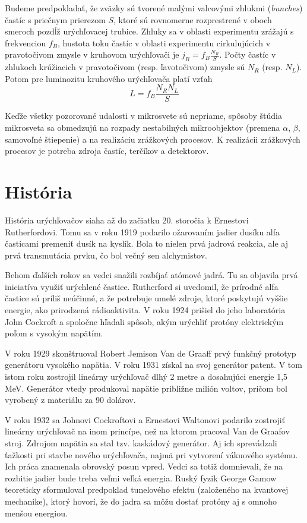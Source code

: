 \documentclass[../../main.tex]{subfiles}
\begin{document}
Budeme predpokladať, že zväzky sú tvorené malými valcovými zhlukmi (\textit{bunches}) častíc s priečnym prierezom $S$, ktoré sú rovnomerne rozprestrené v oboch smeroch pozdĺž urýchľovacej trubice. Zhluky sa v oblasti experimentu zrážajú s frekvenciou $f_B$, hustota toku častíc v oblasti experimentu cirkulujúcich v pravotočivom zmysle v kruhovom urýchľovači je $j_R=f_B\frac{N_R}{S}$. Počty častíc v zhlukoch krúžiacich v pravotočivom (resp. ľavotočivom) zmysle sú $N_R$ (resp. $N_L$). Potom pre luminozitu kruhového urýchľovača platí vzťah
\begin{equation}
L=f_B\dfrac{N_RN_L}{S}
\end{equation}

Keďže všetky pozorované udalosti v mikrosvete sú nepriame, spôsoby štúdia mikrosveta sa obmedzujú na rozpady nestabilných mikroobjektov (premena $\alpha$, $\beta$, samovoľné štiepenie) a na realizáciu zrážkových procesov. K realizácii zrážkových procesov je potreba zdroja častíc, terčíkov a detektorov.

\section{História}

História urýchľovačov siaha až do začiatku 20. storočia k Ernestovi Rutherfordovi. Tomu sa v roku 1919 podarilo ožarovaním jadier dusíku alfa časticami premeniť dusík na kyslík. Bola to nielen prvá jadrová reakcia, ale aj prvá transmutácia prvku, čo bol večný sen alchymistov. 

Behom ďalších rokov sa vedci snažili rozbíjať atómové jadrá. Tu sa objavila prvá iniciatíva využiť urýchlené častice. Rutherford si uvedomil, že prírodné alfa častice sú príliš neúčinné, a že potrebuje umelé zdroje, ktoré poskytujú vyššie energie, ako prirodzená rádioaktivita. V roku 1924 prišiel do jeho laboratória John Cockroft a spoločne hľadali spôsob, akým urýchliť protóny elektrickým poľom s vysokým napätím. 

V roku 1929 skonštruoval Robert Jemison Van de Graaff prvý funkčný prototyp generátoru vysokého napätia. V roku 1931 získal na svoj generátor patent. V tom istom roku zostrojil lineárny urýchľovač dlhý 2 metre a dosahujúci energie 1,5 MeV. Generátor vtedy produkoval napätie približne milión voltov, pričom bol vyrobený z materiálu za 90 dolárov. 

V roku 1932 sa Johnovi Cockroftovi a Ernestovi Waltonovi podarilo zostrojiť lineárny urýchľovač na inom princípe, než na ktorom pracoval Van de Graafov stroj. Zdrojom napätia sa stal tzv. kaskádový generátor. Aj ich sprevádzali ťažkosti pri stavbe nového urýchľovača, najmä pri vytvorení vákuového systému. Ich práca znamenala obrovský posun vpred. Vedci sa totiž domnievali, že na rozbitie jadier bude treba veľmi veľká energia. Ruský fyzik George Gamow teoreticky sformuloval predpoklad tunelového efektu (založeného na kvantovej mechanike), ktorý hovorí, že do jadra sa môžu dostať protóny aj s omnoho menšou energiou.
\end{document}

